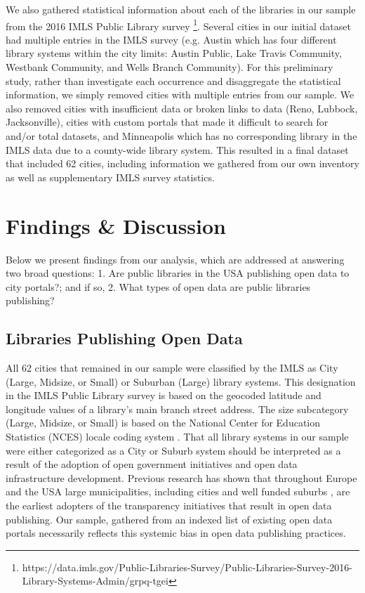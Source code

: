\documentclass[sigconf]{acmart}
\begin{document}
We also gathered statistical information about each of the libraries in our sample from the 2016 IMLS Public Library survey \footnote{https://data.imls.gov/Public-Libraries-Survey/Public-Libraries-Survey-2016-Library-Systems-Admin/grpq-tgei}. Several cities in our initial dataset had multiple entries in the IMLS survey (e.g. Austin which has four different library systems within the city limits: Austin Public, Lake Travis Community, Westbank Community, and Wells Branch Community). For this preliminary study, rather than investigate each occurrence and disaggregate the statistical information, we simply removed cities with multiple entries from our sample. We also removed cities with insufficient data or broken links to data (Reno, Lubbock, Jacksonville), cities with custom portals that made it difficult to search for and/or total datasets, and Minneapolis which has no corresponding library in the IMLS data due to a county-wide library system. This resulted in a final dataset that included 62 cities, including information we gathered from our own inventory as well as supplementary IMLS survey statistics.
\section{Findings \& Discussion}
Below we present findings from our analysis, which are addressed at answering two broad questions: 1. Are public libraries in the USA publishing open data to city portals?; and if so, 2. What types of open data are public libraries publishing?

\subsection{Libraries Publishing Open Data}
All 62 cities that remained in our sample were classified by the IMLS as City (Large, Midsize, or Small) or Suburban (Large) library systems. This designation in the IMLS Public Library survey is based on the geocoded latitude and longitude values of a library's main branch street address. The size subcategory (Large, Midsize, or Small) is based on the National Center for Education Statistics (NCES) locale coding system \cite{plsreport2016}. That all library systems in our sample were either categorized as a City or Suburb system should be interpreted as a result of the adoption of open government initiatives and open data infrastructure development.  Previous research has shown that throughout Europe \cite{conradie2012exploring} and the USA \cite{bearfield2017can} large municipalities, including cities and well funded suburbs \cite{mergel2018open}, are the earliest adopters of the transparency initiatives that result in open data publishing. Our sample, gathered from an indexed list of existing open data portals necessarily reflects this systemic bias in open data publishing practices.
\end{document}
